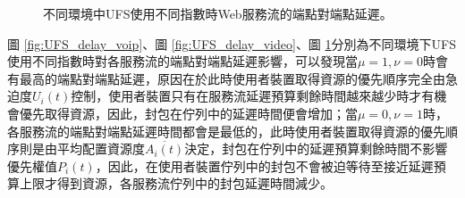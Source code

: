 \begin{figure}[H]
\centering
{}
\caption{\label{fig:UFS_delay_web}不同環境中UFS使用不同指數時Web服務流的端點對端點延遲。}
\end{figure}
圖 \ref{fig:UFS_delay_voip}、圖 \ref{fig:UFS_delay_video}、圖 \ref{fig:UFS_delay_web}分別為不同環境下UFS使用不同指數時對各服務流的端點對端點延遲影響，可以發現當$\mu=1,\nu=0$時會有最高的端點對端點延遲，原因在於此時使用者裝置取得資源的優先順序完全由急迫度$U_i(t)$控制，使用者裝置只有在服務流延遲預算剩餘時間越來越少時才有機會優先取得資源，因此，封包在佇列中的延遲時間便會增加；當$\mu=0,\nu=1$時，各服務流的端點對端點延遲時間都會是最低的，此時使用者裝置取得資源的優先順序則是由平均配置資源度$\overline{A_i(t)}$決定，封包在佇列中的延遲預算剩餘時間不影響優先權值$P_i(t)$，因此，在使用者裝置佇列中的封包不會被迫等待至接近延遲預算上限才得到資源，各服務流佇列中的封包延遲時間減少。
